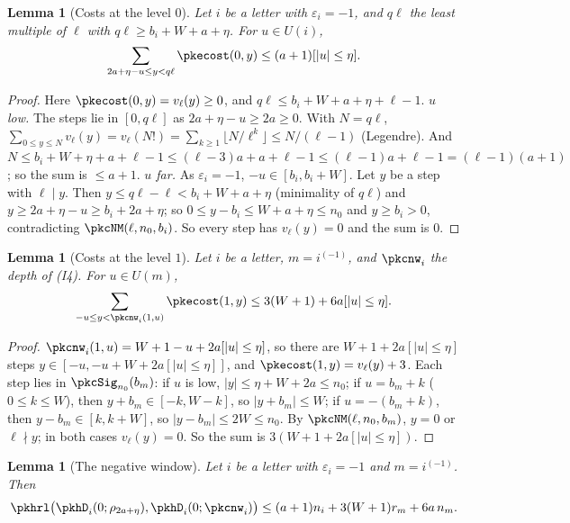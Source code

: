\documentclass[10pt]{amsart}
\newtheorem{lemma}[theorem]{Lemma}
\theoremstyle{definition}
\theoremstyle{remark}
\begin{document}
\begin{lemma}[Costs at the level $0$]\label{pkh:cost0}
Let $i$ be a letter with $\varepsilon_i=-1$, and $q\ell$ the least multiple of $\ell$ with $q\ell\ge
b_i+W+a+\eta$. For $u\in U(i)$,
\[
\sum_{2a+\eta-u\le y<q\ell}\pkecost(0,y)\le(a+1)[|u|\le\eta].
\]
\end{lemma}

\begin{proof}
Here $\pkecost(0,y)=v_\ell(y)\ge0$, and $q\ell\le b_i+W+a+\eta+\ell-1$. \emph{$u$ low.} The steps lie in
$[0,q\ell]$ as $2a+\eta-u\ge2a\ge0$. With $N=q\ell$, $\sum_{0\le y\le N}v_\ell(y)=v_\ell(N!)=\sum_{k\ge1}\lfloor
N/\ell^k\rfloor\le N/(\ell-1)$ (Legendre). And $N\le b_i+W+\eta+a+\ell-1\le(\ell-3)a+a+\ell-1\le(\ell-1)a+\ell-1=
(\ell-1)(a+1)$; so the sum is $\le a+1$. \emph{$u$ far.} As $\varepsilon_i=-1$, $-u\in[b_i,b_i+W]$. Let $y$ be a
step with $\ell\mid y$. Then $y\le q\ell-\ell<b_i+W+a+\eta$ (minimality of $q\ell$) and $y\ge2a+\eta-u\ge
b_i+2a+\eta$; so $0\le y-b_i\le W+a+\eta\le n_0$ and $y\ge b_i>0$, contradicting $\pkcNM(\ell,n_0,b_i)$. So every
step has $v_\ell(y)=0$ and the sum is $0$.
\end{proof}

\begin{lemma}[Costs at the level $1$]\label{pkh:cost1}
Let $i$ be a letter, $m=i^{(-1)}$, and $\pkcnw_i$ the depth of (I4). For $u\in U(m)$,
\[
\sum_{-u\le y<\pkcnw_i(1,u)}\pkecost(1,y)\le3(W+1)+6a[|u|\le\eta].
\]
\end{lemma}

\begin{proof}
$\pkcnw_i(1,u)=W+1-u+2a[|u|\le\eta]$, so there are $W+1+2a[|u|\le\eta]$ steps $y\in[-u,-u+W+2a[|u|\le\eta]]$,
and $\pkecost(1,y)=v_\ell(y)+3$. Each step lies in $\pkcSig_{n_0}(b_m)$: if $u$ is low, $|y|\le\eta+W+2a\le n_0$;
if $u=b_m+k$ ($0\le k\le W$), then $y+b_m\in[-k,W-k]$, so $|y+b_m|\le W$; if $u=-(b_m+k)$, then $y-b_m\in[k,k+W]$,
so $|y-b_m|\le2W\le n_0$. By $\pkcNM(\ell,n_0,b_m)$, $y=0$ or $\ell\nmid y$; in both cases $v_\ell(y)=0$. So
the sum is $3(W+1+2a[|u|\le\eta])$.
\end{proof}

\begin{lemma}[The negative window]\label{pkh:neg}
Let $i$ be a letter with $\varepsilon_i=-1$ and $m=i^{(-1)}$. Then
\[
\pkhrl\bigl(\pkhD_i(0;\rho_{2a+\eta}),\pkhD_i(0;\pkcnw_i)\bigr)\le(a+1)n_i+3(W+1)r_m+6a\,n_m .
\]
\end{lemma}
\end{document}
